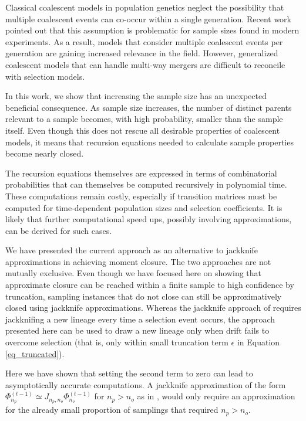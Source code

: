 \documentclass[review]{elsarticle}
\newcommand{\afs}[2]{\Phi_{#1}^{(#2)}}
\begin{document}
Classical coalescent models in population genetics neglect the possibility that multiple coalescent events 
can co-occur within a single generation. 
Recent work \citep{BhaskarEtAl2014,NelsonEtAl2019} pointed out that this
assumption is problematic for sample sizes found in modern experiments. As a result, models
that consider multiple coalescent events per generation are gaining increased relevance in the field.
However, generalized coalescent models that can handle multi-way mergers are difficult to reconcile 
with selection models.

In this work, we show that increasing the sample size has an unexpected beneficial consequence. 
As sample size increases, the number of distinct parents relevant to a sample becomes, 
with high probability, smaller than the sample itself. Even though this does not rescue
all desirable properties of coalescent models, it means that recursion equations 
needed to calculate sample properties become nearly closed. 

The recursion equations themselves  are expressed in terms of combinatorial probabilities 
that can themselves be computed recursively in polynomial time. These computations 
remain costly, especially if transition matrices must be computed for time-dependent
population sizes and selection coefficients. It is likely that further computational 
speed ups, possibly involving approximations, can be derived for such cases.  

We have presented the current approach as an alternative to jackknife approximations in 
achieving moment closure. The two approaches are not mutually exclusive. 
Even though we have focused here on showing that approximate closure can be reached within 
a finite sample to high confidence by truncation, sampling instances that do not close can still be approximatively closed
using jackknife approximations. Whereas the jackknife approach of \cite{JouganousEtAl2017} requires 
jackknifing a new lineage every time a selection event occurs, the approach presented
here can be used to draw a new lineage only when drift fails to overcome selection 
(that is, only within small truncation term $\epsilon$ in Equation \eqref{eq_truncated}).


Here we have shown that setting the second term to zero can lead to asymptotically accurate computations. 
A jackknife approximation of the form $\afs{n_p}{t-1} \simeq J_{n_p, n_o} \afs{n_o}{t-1}$ for $n_p>n_o$ as in \cite{Gravel2016}, 
would only require an approximation for the already small proportion of samplings that required $n_p>n_o.$
\end{document}
